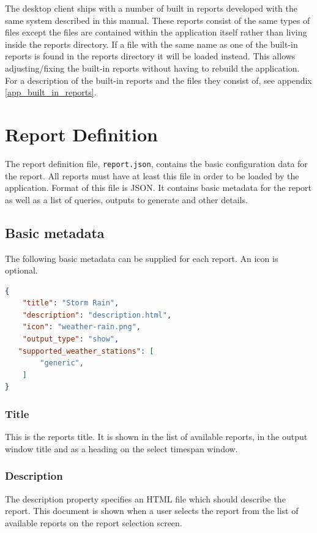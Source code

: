 \documentclass[a4paper,10pt]{book}
\begin{document}
The desktop client ships with a number of built in reports developed with the same system described in this manual. These reports consist of the same types of files except the files are contained within the application itself rather than living inside the reports directory. If a file with the same name as one of the built-in reports is found in the reports directory it will be loaded instead. This allows adjusting/fixing the built-in reports without having to rebuild the application. For a description of the built-in reports and the files they consist of, see appendix \ref{app_built_in_reports}.

\chapter{Report Definition}
The report definition file, \verb|report.json|, contains the basic configuration data for the report. All reports must have at least this file in order to be loaded by the application. Format of this file is JSON. It contains basic metadata for the report as well as a list of queries, outputs to generate and other details.

\section{Basic metadata}
The following basic metadata can be supplied for each report. An icon is optional.

\begin{lstlisting}[language=json]
{
    "title": "Storm Rain",
    "description": "description.html",
    "icon": "weather-rain.png",
    "output_type": "show",
   "supported_weather_stations": [
        "generic",
    ]
}
\end{lstlisting}

\subsection{Title}
This is the reports title. It is shown in the list of available reports, in the output window title and as a heading on the select timespan window.

\subsection{Description}
The description property specifies an HTML file which should describe the report. This document is shown when a user selects the report from the list of available reports on the report selection screen.
\end{document}
